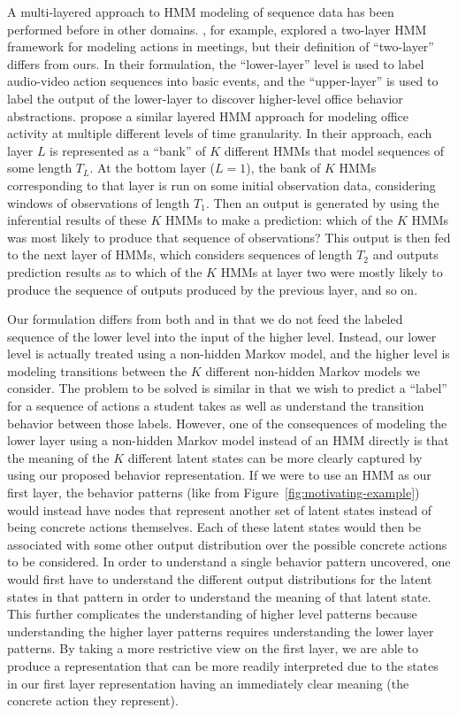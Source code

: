 A multi-layered approach to HMM modeling of sequence data has been
performed before in other domains. \citet{Zhang:2004:CVPR}, for example,
explored a two-layer HMM framework for modeling actions in meetings, but
their definition of ``two-layer'' differs from ours. In their formulation,
the ``lower-layer'' level is used to label audio-video action sequences
into basic events, and the ``upper-layer'' is used to label the output of
the lower-layer to discover higher-level office behavior abstractions.
\citet{Oliver:2004:CVIU} propose a similar layered HMM approach
for modeling office activity at multiple different levels of time
granularity. In their approach, each layer $L$ is represented as a ``bank''
of $K$ different HMMs that model sequences of some length $T_L$. At the
bottom layer ($L = 1$), the bank of $K$ HMMs corresponding to that layer is
run on some initial observation data, considering windows of observations
of length $T_1$. Then an output is generated by using the inferential
results of these $K$ HMMs to make a prediction: which of the $K$ HMMs was
most likely to produce that sequence of observations? This output is then
fed to the next layer of HMMs, which considers sequences of length $T_2$
and outputs prediction results as to which of the $K$ HMMs at layer two
were mostly likely to produce the sequence of outputs produced by the
previous layer, and so on.

Our formulation differs from both \citet{Zhang:2004:CVPR} and
\citet{Oliver:2004:CVIU} in that we do not feed the labeled sequence of the
lower level into the input of the higher level. Instead, our lower level is
actually treated using a non-hidden Markov model, and the higher level is
modeling transitions between the $K$ different non-hidden Markov models we
consider. The problem to be solved is similar in that we wish to predict a
``label'' for a sequence of actions a student takes as well as understand
the transition behavior between those labels.  However, one of the
consequences of modeling the lower layer using a non-hidden Markov model
instead of an HMM directly is that the meaning of the $K$ different latent
states can be more clearly captured by using our proposed behavior
representation. If we were to use an HMM as our first layer, the behavior
patterns (like from Figure~\ref{fig:motivating-example}) would instead have
nodes that represent another set of latent states instead of being concrete
actions themselves. Each of these latent states would then be associated
with some other output distribution over the possible concrete actions to
be considered. In order to understand a single behavior pattern uncovered,
one would first have to understand the different output distributions for
the latent states in that pattern in order to understand the meaning of
that latent state. This further complicates the understanding of higher
level patterns because understanding the higher layer patterns requires
understanding the lower layer patterns. By taking a more restrictive view
on the first layer, we are able to produce a representation that can be
more readily interpreted due to the states in our first layer
representation having an immediately clear meaning (the concrete action
they represent).

